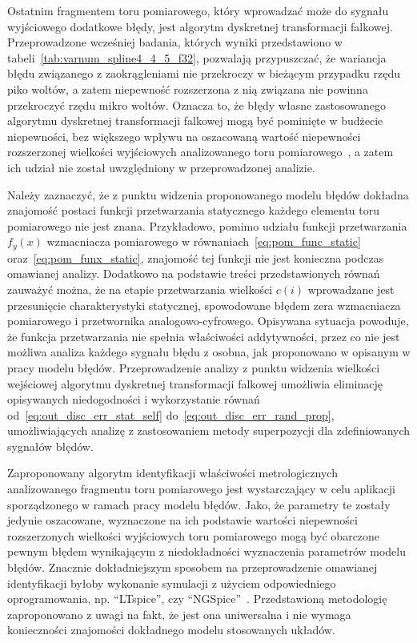 Ostatnim fragmentem toru pomiarowego, który wprowadzać może do sygnału wyjściowego dodatkowe błędy, jest algorytm dyskretnej transformacji falkowej. Przeprowadzone wcześniej badania, których wyniki przedstawiono w tabeli~\ref{tab:varnum_spline4_4_5_f32}, pozwalają przypuszczać, że wariancja błędu związanego z zaokrągleniami nie przekroczy w bieżącym przypadku rzędu piko woltów, a zatem niepewność rozszerzona z nią związana nie powinna przekroczyć rzędu mikro woltów. Oznacza to, że błędy własne zastosowanego algorytmu dyskretnej transformacji falkowej mogą być pominięte w budżecie niepewności, bez większego wpływu na oszacowaną wartość niepewności rozszerzonej wielkości wyjściowych analizowanego toru pomiarowego~\cite{jcgm_guide}, a zatem ich udział nie został uwzględniony w przeprowadzonej analizie.

Należy zaznaczyć, że z punktu widzenia proponowanego modelu błędów dokładna znajomość postaci funkcji przetwarzania statycznego każdego elementu toru pomiarowego nie jest znana. Przykładowo, pomimo udziału funkcji przetwarzania $f_{y}(x)$ wzmacniacza pomiarowego w równaniach~\eqref{eq:pom_func_static} oraz~\eqref{eq:pom_funx_static}, znajomość tej funkcji nie jest konieczna podczas omawianej analizy. Dodatkowo na podstawie treści przedstawionych równań zauważyć można, że na etapie przetwarzania wielkości $c(i)$ wprowadzane jest przesunięcie charakterystyki statycznej, spowodowane błędem zera wzmacniacza pomiarowego i przetwornika analogowo-cyfrowego. Opisywana sytuacja powoduje, że funkcja przetwarzania nie spełnia właściwości addytywności, przez co nie jest możliwa analiza każdego sygnału błędu z osobna, jak proponowano w opisanym w pracy modelu błędów. Przeprowadzenie analizy z punktu widzenia wielkości wejściowej algorytmu dyskretnej transformacji falkowej umożliwia eliminację opisywanych niedogodności i wykorzystanie równań od~\eqref{eq:out_disc_err_stat_self} do~\eqref{eq:out_disc_err_rand_prop}, umożliwiających analizę z zastosowaniem metody superpozycji dla zdefiniowanych sygnałów błędów.

Zaproponowany algorytm identyfikacji właściwości metrologicznych analizowanego fragmentu toru pomiarowego jest wystarczający w celu aplikacji sporządzonego w ramach pracy modelu błędów. Jako, że parametry te zostały jedynie oszacowane, wyznaczone na ich podstawie wartości niepewności rozszerzonych wielkości wyjściowych toru pomiarowego mogą być obarczone pewnym błędem wynikającym z niedokładności wyznaczenia parametrów modelu błędów. Znacznie dokładniejszym sposobem na przeprowadzenie omawianej identyfikacji byłoby wykonanie symulacji z użyciem odpowiedniego oprogramowania, np. \enquote{LTspice}, czy \enquote{NGSpice}~\cite{mikkelsen_ltspice, nenzi_ngspice}. Przedstawioną metodologię zaproponowano z uwagi na fakt, że jest ona uniwersalna i nie wymaga konieczności znajomości dokładnego modelu stosowanych układów.

